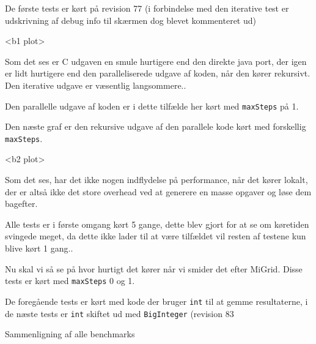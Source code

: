 De første tests er kørt på revision 77 (i forbindelse med den iterative test er
udskrivning af debug info til skærmen dog blevet kommenteret ud)

<b1 plot>

Som det ses er C udgaven en smule hurtigere end den direkte java port, der igen
er lidt hurtigere end den paralleliserede udgave af koden, når den kører
rekursivt. Den iterative udgave er væsentlig langsommere..

Den parallelle udgave af koden er i dette tilfælde her kørt med
\texttt{maxSteps} på 1. 

Den næste graf er den rekursive udgave af den parallele kode kørt med forskellig
\texttt{maxSteps}. 

<b2 plot>

Som det ses, har det ikke nogen indflydelse på performance, når det kører
lokalt, der er altså ikke det store overhead ved at generere en masse opgaver og
løse dem bagefter. 


Alle tests er i første omgang kørt 5 gange, dette blev gjort for at se om
køretiden svingede meget, da dette ikke lader til at være tilfældet vil resten
af testene kun blive kørt 1 gang.. 


Nu skal vi så se på hvor hurtigt det kører når vi smider det efter MiGrid. 
Disse tests er kørt med \texttt{maxSteps} 0 og 1. 


De foregående tests er kørt med kode der bruger \texttt{int} til at gemme resultaterne,
i de næste tests er \texttt{int} skiftet ud med \texttt{BigInteger} (revision
83

Sammenligning af alle benchmarks

